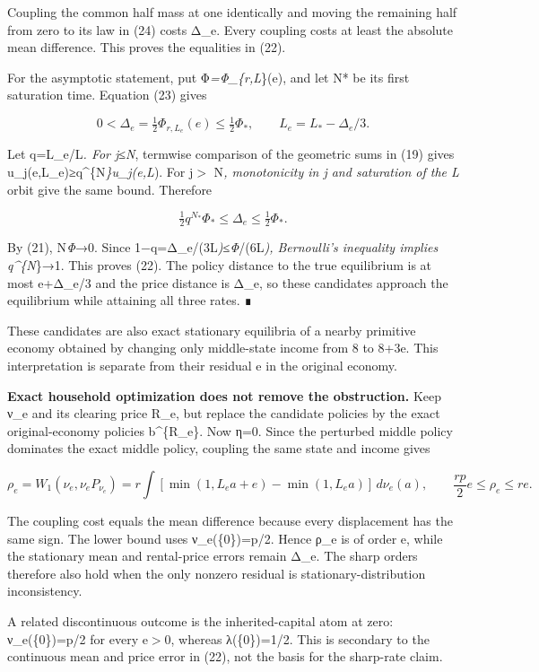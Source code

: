 \documentclass{article}
\begin{document}
Coupling the common half mass at one identically and moving the remaining half from zero to its law in (24) costs Δ\_e. Every coupling costs at least the absolute mean difference. This proves the equalities in (22).

For the asymptotic statement, put Φ\emph{=Φ\_\{r,L}\}(e), and let N* be its first saturation time. Equation (23) gives

\[
0<\Delta_e=\tfrac12\Phi_{r,L_e}(e)\le\tfrac12\Phi_*,
\qquad L_e=L_*-\Delta_e/3.
\]

Let q=L\_e/L\emph{. For j≤N}, termwise comparison of the geometric sums in (19) gives u\_j(e,L\_e)≥q\^{}\{N\emph{\}u\_j(e,L}). For j\(\gt\) N\emph{, monotonicity in j and saturation of the L} orbit give the same bound. Therefore

\[
\tfrac12 q^{N_*}\Phi_*\le\Delta_e\le\tfrac12\Phi_*.
\]

By (21), N\emph{Φ}→0. Since 1−q=Δ\_e/(3L\emph{)≤Φ}/(6L\emph{), Bernoulli's inequality implies q\^{}\{N}\}→1. This proves (22). The policy distance to the true equilibrium is at most e+Δ\_e/3 and the price distance is Δ\_e, so these candidates approach the equilibrium while attaining all three rates. ∎

These candidates are also exact stationary equilibria of a nearby primitive economy obtained by changing only middle-state income from 8 to 8+3e. This interpretation is separate from their residual e in the original economy.

\textbf{Exact household optimization does not remove the obstruction.} Keep ν\_e and its clearing price R\_e, but replace the candidate policies by the exact original-economy policies b\^{}\{R\_e\}. Now η=0. Since the perturbed middle policy dominates the exact middle policy, coupling the same state and income gives

\[
\rho_e=W_1(\nu_e,\nu_e P_{\nu_e})
=r\int\left[\min(1,L_ea+e)-\min(1,L_ea)\right]\,d\nu_e(a),
\qquad
\frac{rp}{2}e\le\rho_e\le re.
\]

The coupling cost equals the mean difference because every displacement has the same sign. The lower bound uses ν\_e(\{0\})=p/2. Hence ρ\_e is of order e, while the stationary mean and rental-price errors remain Δ\_e. The sharp orders therefore also hold when the only nonzero residual is stationary-distribution inconsistency.

A related discontinuous outcome is the inherited-capital atom at zero: ν\_e(\{0\})=p/2 for every e\(\gt\)0, whereas λ(\{0\})=1/2. This is secondary to the continuous mean and price error in (22), not the basis for the sharp-rate claim.
\end{document}
